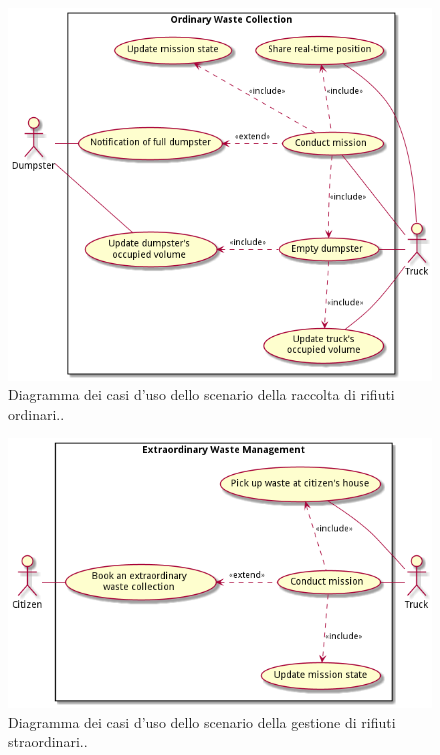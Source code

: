 \begin{figure}[H]
    \centering
    \includegraphics[width=\textwidth]{../img/ordinary-collection-use-cases.pm}
    \caption{Diagramma dei casi d'uso dello scenario della raccolta di rifiuti ordinari..}
    \label{fig:ordinary-collection-use-cases}
\end{figure}

\begin{figure}[H]
    \centering
    \includegraphics[width=\textwidth]{../img/extraordinary-management-use-cases.pm}
    \caption{Diagramma dei casi d'uso dello scenario della gestione di rifiuti straordinari..}
    \label{fig:extraordinary-management-use-cases}
\end{figure}

